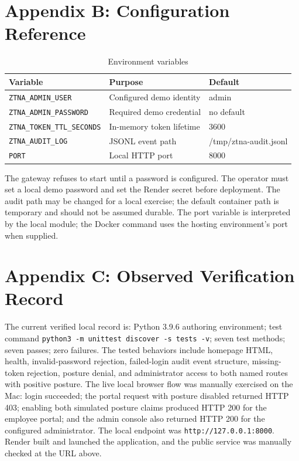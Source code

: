 \section{Appendix B: Configuration Reference}
\begin{table}[ht]
\caption{Environment variables}
\centering
\begin{tabular}{lll}
\toprule
Variable & Purpose & Default\\
\midrule
\texttt{ZTNA\_ADMIN\_USER} & Configured demo identity & admin\\
\texttt{ZTNA\_ADMIN\_PASSWORD} & Required demo credential & no default\\
\texttt{ZTNA\_TOKEN\_TTL\_SECONDS} & In-memory token lifetime & 3600\\
\texttt{ZTNA\_AUDIT\_LOG} & JSONL event path & /tmp/ztna-audit.jsonl\\
\texttt{PORT} & Local HTTP port & 8000\\
\bottomrule
\end{tabular}
\end{table}
The gateway refuses to start until a password is configured. The operator must set a local demo password and set the Render secret before deployment. The audit path may be changed for a local exercise; the default container path is temporary and should not be assumed durable. The port variable is interpreted by the local module; the Docker command uses the hosting environment's port when supplied.

\section{Appendix C: Observed Verification Record}
The current verified local record is: Python 3.9.6 authoring environment; test command \texttt{python3 -m unittest discover -s tests -v}; seven test methods; seven passes; zero failures. The tested behaviors include homepage HTML, health, invalid-password rejection, failed-login audit event structure, missing-token rejection, posture denial, and administrator access to both named routes with positive posture. The live local browser flow was manually exercised on the Mac: login succeeded; the portal request with posture disabled returned HTTP 403; enabling both simulated posture claims produced HTTP 200 for the employee portal; and the admin console also returned HTTP 200 for the configured administrator. The local endpoint was \texttt{http://127.0.0.1:8000}. Render built and launched the application, and the public service was manually checked at the URL above.
